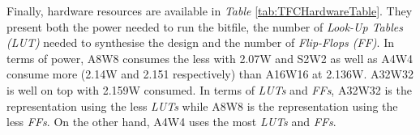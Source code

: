 Finally, hardware resources are available in \emph{Table} \ref{tab:TFCHardwareTable}. They present both the power needed to run the bitfile, the number of \emph{Look-Up Tables (LUT)} needed to synthesise the design and the number of \emph{Flip-Flops (FF)}. In terms of power, A8W8 consumes the less with 2.07W and S2W2 as well as A4W4 consume more (2.14W and 2.151 respectively) than A16W16 at 2.136W. A32W32 is well on top with 2.159W consumed. In terms of \emph{LUTs} and \emph{FFs}, A32W32 is the representation using the less \emph{LUTs} while A8W8 is the representation using the less \emph{FFs}. On the other hand, A4W4 uses the most \emph{LUTs} and \emph{FFs}.


\begin{table}[!htb]
  \centering
\caption[TFC Hardware Utilisation Table]{TFC Hardware Utilisation}
\label{tab:TFCHardwareTable}
\end{table}

%
%

